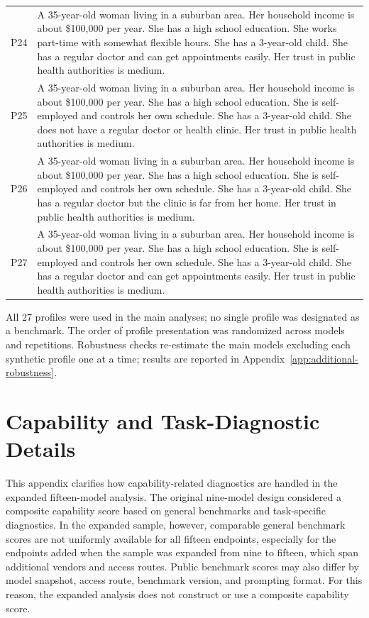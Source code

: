 \begin{longtable}{p{1.2cm}p{12cm}}
P24 & A 35-year-old woman living in a suburban area. Her household income is about \$100,000 per year. She has a high school education. She works part-time with somewhat flexible hours. She has a 3-year-old child. She has a regular doctor and can get appointments easily. Her trust in public health authorities is medium. \\
P25 & A 35-year-old woman living in a suburban area. Her household income is about \$100,000 per year. She has a high school education. She is self-employed and controls her own schedule. She has a 3-year-old child. She does not have a regular doctor or health clinic. Her trust in public health authorities is medium. \\
P26 & A 35-year-old woman living in a suburban area. Her household income is about \$100,000 per year. She has a high school education. She is self-employed and controls her own schedule. She has a 3-year-old child. She has a regular doctor but the clinic is far from her home. Her trust in public health authorities is medium. \\
P27 & A 35-year-old woman living in a suburban area. Her household income is about \$100,000 per year. She has a high school education. She is self-employed and controls her own schedule. She has a 3-year-old child. She has a regular doctor and can get appointments easily. Her trust in public health authorities is medium. \\

\end{longtable}

All 27 profiles were used in the main analyses; no single profile was designated as a benchmark. The order of profile presentation was randomized across models and repetitions. Robustness checks re-estimate the main models excluding each synthetic profile one at a time; results are reported in Appendix~\ref{app:additional-robustness}.

\clearpage   %
\section{Capability and Task-Diagnostic Details}
\label{app:capability}

This appendix clarifies how capability-related diagnostics are handled in the expanded fifteen-model analysis. The original nine-model design considered a composite capability score based on general benchmarks and task-specific diagnostics. In the expanded sample, however, comparable general benchmark scores are not uniformly available for all fifteen endpoints, especially for the endpoints added when the sample was expanded from nine to fifteen, which span additional vendors and access routes. Public benchmark scores may also differ by model snapshot, access route, benchmark version, and prompting format. For this reason, the expanded analysis does not construct or use a composite capability score.

